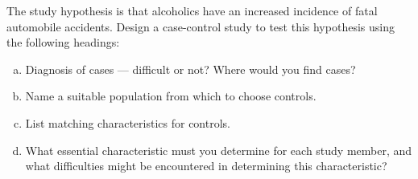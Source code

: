 
The study hypothesis is that alcoholics have an increased incidence of
fatal automobile accidents.  Design a case-control study to test this
hypothesis using the following headings:
\begin{enumerate}[(a)]
\item Diagnosis of cases --- difficult or not?  Where would you find
cases?
\answerSpace{.7in}
\item Name a suitable population from which to choose controls.
\answerSpace{.7in}
\item List matching characteristics for controls.
\answerSpace{.7in}
\item What essential characteristic must you determine for each study member,
and what difficulties might be encountered in determining this characteristic?
\answerSpace{.7in}
\end{enumerate}
